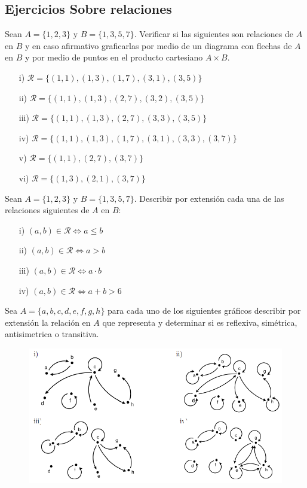 \documentclass[10pt]{article}
\begin{document}
\subsection{Ejercicios Sobre relaciones }
\begin{ej}
Sean $A = \{ 1, 2, 3\}$ y  $B = \{ 1, 3, 5, 7\}$. Verificar si las siguientes son relaciones de $A$ en $B$ y en caso afirmativo graficarlas por medio de un diagrama con flechas de $A$ en $B$ y por medio de puntos en el producto cartesiano $A \times B$.
\begin{itemize}
	\item[i)] $\mathcal{R} = \{ (1,1), (1,3), (1,7), (3,1), (3,5)\}$
	\item[ii)] $\mathcal{R} = \{ (1,1), (1,3), (2,7), (3,2), (3,5)\}$
	\item[iii)] $\mathcal{R} = \{ (1,1), (1,3), (2,7), (3,3), (3,5)\}$
	\item[iv)] $\mathcal{R} = \{ (1,1), (1,3), (1,7), (3,1), (3,3), (3, 7)\}$
	\item[v)] $\mathcal{R} = \{ (1,1), (2,7), (3,7)\}$
	\item[vi)] $\mathcal{R} = \{ (1,3), (2,1), (3,7) \}$
\end{itemize}
\end{ej}

\begin{ej}
Sean $A = \{1,2,3\}$ y $B = \{1, 3, 5, 7\}$. Describir por extensión cada una de las relaciones siguientes de $A$ en $B$:
	\begin{itemize}
		\item[i)] $(a, b) \in \mathcal{R} \Leftrightarrow a \leq b$
		\item[ii)] $(a, b) \in \mathcal{R} \Leftrightarrow a > b$
		\item[iii)] $(a, b) \in \mathcal{R} \Leftrightarrow a \cdot b$
		\item[iv)] $(a, b) \in \mathcal{R} \Leftrightarrow a + b > 6$
	\end{itemize}	 
\end{ej}

\begin{ej}
Sea $A = \{ a, b, c, d, e, f, g, h\}$ para cada uno de los siguientes gráficos describir por extensión la relación en $A$ que representa y determinar si es reflexiva, simétrica, antisimetrica o transitiva.
\begin{figure}[H]
	\centering
	 \includegraphics[scale=0.7]{figuras/relaciones/img2.png}
\end{figure}
\end{ej}
\end{document}
